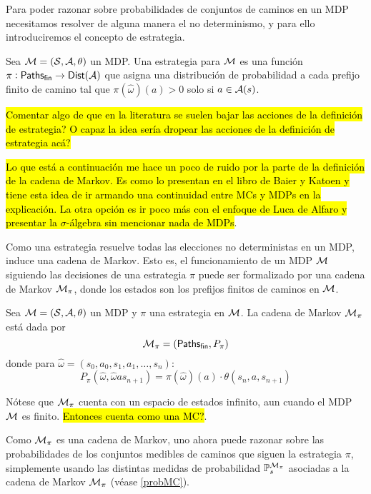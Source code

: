 Para poder razonar sobre probabilidades de conjuntos de caminos en un MDP
necesitamos resolver de alguna manera el no determinismo, y para ello
introduciremos el concepto de estrategia.

\begin{definition}
	Sea $\mathcal{M} = (\mathcal{S}, \mathcal{A}, \theta)$ un MDP. Una estrategia para $\mathcal{M}$ es una función $\pi: \textsf{Paths}_\textsf{fin} \rightarrow \mathsf{Dist} (\mathcal{A})$ que asigna una distribución de probabilidad a cada prefijo finito de camino tal que $\pi(\hat \omega) (a) > 0$ solo si $a \in \mathcal{A}(s)$.
\end{definition}

\hl{Comentar algo de que en la literatura se suelen bajar las acciones de la definición de estrategia? O capaz la idea sería dropear las acciones de la definición de estrategia acá?}

\hl{Lo que está a continuación me hace un poco de ruido por la parte de la definición de la cadena de Markov. Es como lo presentan en el libro de Baier y Katoen y tiene esta idea de ir armando una continuidad entre MCs y MDPs en la explicación. La otra opción es ir poco más con el enfoque de Luca de Alfaro y presentar la $\sigma$-álgebra sin mencionar nada de MDPs}.

Como una estrategia resuelve todas las elecciones no deterministas en un MDP,
induce una cadena de Markov. Esto es, el funcionamiento de un MDP $\mathcal{M}$
siguiendo las decisiones de una estrategia $\pi$ puede ser formalizado por una
cadena de Markov $\mathcal{M}_\pi$, donde los estados son los prefijos finitos de
caminos en $\mathcal{M}$.

\begin{definition}
	Sea $\mathcal{M} = (\mathcal{S}, \mathcal{A}, \theta)$ un MDP y $\pi$ una estrategia en $\mathcal{M}$. La cadena de Markov $\mathcal{M}_\pi$ está dada por
	$$\mathcal{M}_\pi = (\textsf{Paths}_\textsf{fin}, P_\pi)$$
	donde para $\hat \omega = (s_0, a_0, s_1, a_1, \dots, s_n)$:
	$$P_\pi(\hat \omega, \hat \omega a s_{n+1}) = \pi(\hat \omega)(a) \cdot \theta(s_n, a, s_{n+1})$$
\end{definition}

Nótese que $\mathcal{M}_\pi$ cuenta con un espacio de estados infinito, aun cuando el
MDP $\mathcal{M}$ es finito. \hl{Entonces cuenta como una MC?}.

Como $\mathcal{M}_\pi$ es una cadena de Markov, uno ahora puede razonar sobre las
probabilidades de los conjuntos medibles de caminos que siguen la estrategia
$\pi$, simplemente usando las distintas medidas de probabilidad
$\mathbb{P}^{\mathcal{M}_\pi}_s$ asociadas a la cadena de Markov $\mathcal{M}_\pi$ (véase
\ref{probMC}).


